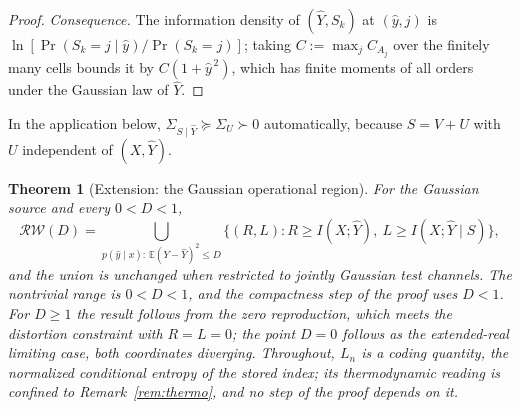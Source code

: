 ﻿\documentclass[11pt,onecolumn]{IEEEtran}
\newtheorem{theorem}{Theorem}
\newcommand{\E}{\mathbb{E}}
\newcommand{\hY}{\widehat{Y}}
\newcommand{\RW}{\mathcal{R}\!\mathcal{W}}
\begin{document}
\begin{proof}
\emph{Consequence.} The information density of $(\hY,S_k)$ at
$(\hat y,j)$ is $\ln[\Pr(S_k=j\mid\hat y)/\Pr(S_k=j)]$; taking
$C:=\max_jC_{A_j}$ over the finitely many cells bounds it by
$C(1+\hat y^{\,2})$, which has finite moments of all orders under the
Gaussian law of $\hY$.
\end{proof}

In the application below, $\Sigma_{S\mid\hY}\succeq\Sigma_U\succ0$
automatically, because $S=V+U$ with $U$ independent of $(X,\hY)$.

\begin{theorem}[Extension: the Gaussian operational region]\label{thm:gaussop}
For the Gaussian source and every $0<D<1$,
\[
\RW(D)=\bigcup_{p(\hat y\mid x):\,\E(Y-\hY)^2\le D}
\bigl\{(R,L):R\ge I(X;\hY),\ L\ge I(X;\hY\mid S)\bigr\},
\]
and the union is unchanged when restricted to jointly Gaussian test
channels. The nontrivial range is $0<D<1$, and the compactness step of
the proof uses $D<1$. For $D\ge1$ the result follows from the zero
reproduction, which meets the distortion constraint with $R=L=0$; the
point $D=0$ follows as the extended-real limiting case, both
coordinates diverging. Throughout, $L_n$ is a coding quantity, the
normalized conditional entropy of the stored index; its thermodynamic
reading is confined to Remark~\ref{rem:thermo}, and no step of the
proof depends on it.
\end{theorem}
\end{document}
